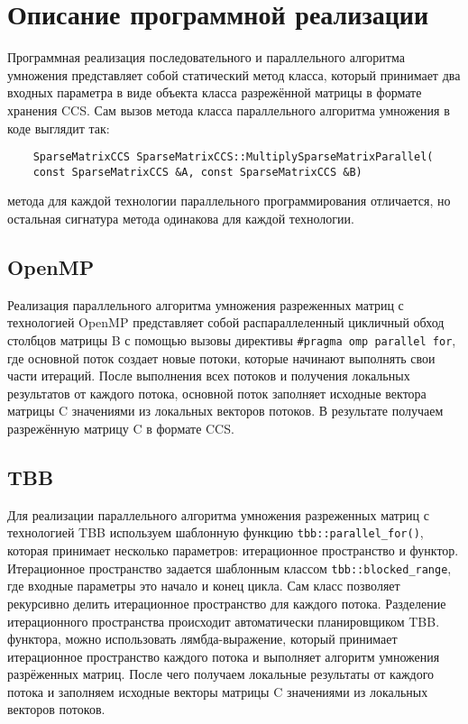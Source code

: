 \documentclass[14pt,a4paper,report]{ncc}
\begin{document}
	
	\section*{Описание программной реализации}
	Программная реализация последовательного и параллельного алгоритма умножения представляет собой статический метод класса, который принимает два входных параметра в виде объекта класса разрежённой матрицы в формате хранения CCS. Сам вызов метода класса параллельного алгоритма умножения в коде выглядит так:
	\begin{lstlisting}
	SparseMatrixCCS SparseMatrixCCS::MultiplySparseMatrixParallel(
	const SparseMatrixCCS &A, const SparseMatrixCCS &B)
	\end{lstlisting}
	 метода для каждой технологии параллельного программирования отличается, но остальная сигнатура метода одинакова для каждой технологии.
	
	\subsection*{OpenMP}
	Реализация параллельного алгоритма умножения разреженных матриц с технологией OpenMP представляет собой распараллеленный цикличный обход столбцов матрицы B с помощью вызовы директивы \verb|#pragma omp parallel for|, где основной поток создает новые потоки, которые начинают выполнять свои части итераций. После выполнения всех потоков и получения локальных результатов от каждого потока, основной поток заполняет исходные вектора матрицы C значениями из локальных векторов потоков. В результате получаем разрежённую матрицу C в формате CCS.
	
	
	\subsection*{TBB}
	Для реализации параллельного алгоритма умножения разреженных матриц с технологией TBB используем шаблонную функцию \verb|tbb::parallel_for()|, которая принимает несколько параметров: итерационное пространство и функтор. Итерационное пространство задается шаблонным классом \verb|tbb::blocked_range|, где входные параметры это начало и конец цикла. Сам класс позволяет рекурсивно делить итерационное пространство для каждого потока. Разделение итерационного пространства происходит автоматически планировщиком TBB.
	 функтора, можно использовать лямбда-выражение, который принимает итерационное пространство каждого потока и выполняет алгоритм умножения разрёженных матриц. После чего получаем локальные результаты от каждого потока и заполняем исходные векторы матрицы C значениями из локальных векторов потоков. 
	
\end{document}
